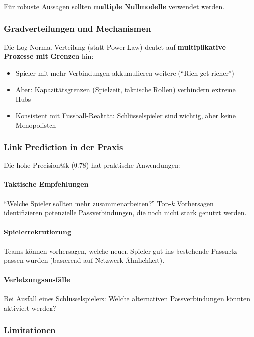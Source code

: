 Für robuste Aussagen sollten \textbf{multiple Nullmodelle} verwendet werden.

\subsubsection{Gradverteilungen und Mechanismen}

Die Log-Normal-Verteilung (statt Power Law) deutet auf \textbf{multiplikative Prozesse mit Grenzen} hin:

\begin{itemize}
  \item Spieler mit mehr Verbindungen akkumulieren weitere (``Rich get richer'')
  \item Aber: Kapazitätsgrenzen (Spielzeit, taktische Rollen) verhindern extreme Hubs
  \item Konsistent mit Fussball-Realität: Schlüsselspieler sind wichtig, aber keine Monopolisten
\end{itemize}

\subsubsection{Link Prediction in der Praxis}

Die hohe Precision@k (0.78) hat praktische Anwendungen:

\paragraph{Taktische Empfehlungen}
``Welche Spieler sollten mehr zusammenarbeiten?'' Top-$k$ Vorhersagen identifizieren potenzielle Passverbindungen, die noch nicht stark genutzt werden.

\paragraph{Spielerrekrutierung}
Teams können vorhersagen, welche neuen Spieler gut ins bestehende Passnetz passen würden (basierend auf Netzwerk-Ähnlichkeit).

\paragraph{Verletzungsausfälle}
Bei Ausfall eines Schlüsselspielers: Welche alternativen Passverbindungen könnten aktiviert werden?

\subsubsection{Limitationen}

